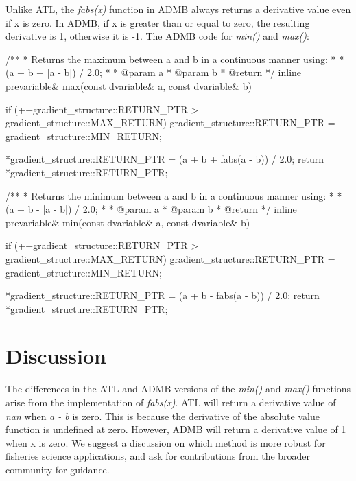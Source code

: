 \documentclass[oneside]{article}
\begin{document}
Unlike ATL, the \textit{fabs(x)} function in ADMB always returns a derivative value even if x is zero. In ADMB, if x is greater than or equal to zero, the resulting derivative is 1, otherwise it is -1.  The ADMB code for \textit{min()} and \textit{max()}:

\begin{cppsource}

/**
 * Returns the maximum between a and b in a continuous manner using:
 *
 * (a + b + |a - b|) / 2.0;
 *
 * @param a
 * @param b
 * @return
 */
inline prevariable& max(const dvariable& a, const dvariable& b) {
    if (++gradient_structure::RETURN_PTR > gradient_structure::MAX_RETURN)
        gradient_structure::RETURN_PTR = gradient_structure::MIN_RETURN;

    *gradient_structure::RETURN_PTR = (a + b + fabs(a - b)) / 2.0;
    return *gradient_structure::RETURN_PTR;
}


/**
 * Returns the minimum between a and b in a continuous manner using:
 *
 * (a + b - |a - b|) / 2.0;
 *
 * @param a
 * @param b
 * @return
 */
inline prevariable& min(const dvariable& a, const dvariable& b) {
    if (++gradient_structure::RETURN_PTR > gradient_structure::MAX_RETURN)
        gradient_structure::RETURN_PTR = gradient_structure::MIN_RETURN;

    *gradient_structure::RETURN_PTR = (a + b - fabs(a - b)) / 2.0;
    return *gradient_structure::RETURN_PTR;
}

\end{cppsource}



\section{Discussion}

The differences in the ATL and ADMB versions of the \textit{min()} and \textit{max()} functions arise from the implementation of \textit{fabs(x)}. ATL will return a derivative value of \textit{nan} when \textit{a - b} is zero. This is because the derivative of the absolute value function is undefined at zero. However, ADMB will return a derivative value of 1 when x is zero. We suggest a discussion on which method is more robust for fisheries science applications, and ask for contributions from the broader community for guidance.
\end{document}
